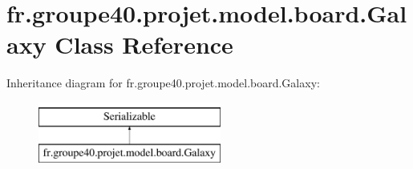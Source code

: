 \hypertarget{classfr_1_1groupe40_1_1projet_1_1model_1_1board_1_1_galaxy}{}\section{fr.\+groupe40.\+projet.\+model.\+board.\+Galaxy Class Reference}
\label{classfr_1_1groupe40_1_1projet_1_1model_1_1board_1_1_galaxy}
Inheritance diagram for fr.\+groupe40.\+projet.\+model.\+board.\+Galaxy\+:\begin{figure}[H]
\begin{center}
\leavevmode
\includegraphics[height=2.000000cm]{classfr_1_1groupe40_1_1projet_1_1model_1_1board_1_1_galaxy}
\end{center}
\end{figure}
